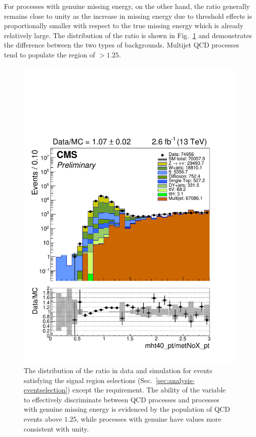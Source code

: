For processes with genuine missing energy, on the other hand, the ratio 
generally remains close to unity as the increase in missing energy due to 
threshold effects is proportionally smaller with respect to the true missing 
energy which is already relatively large. The distribution of the \mhtmet 
ratio is shown in Fig.~\ref{fig:mhtmet} and demonstrates the difference between 
the two types of backgrounds. Multijet QCD processes tend to populate the 
region of \mhtmet$>1.25$.

\begin{figure}[t!]
\begin{center}
\includegraphics[width=0.7\linewidth]{figs/analysis/mhtmet}
\caption{The distribution of the \mhtmet ratio in data and simulation for 
events satisfying the signal region selections 
(Sec.~\ref{sec:analysis-eventselection}) except the \mhtmet requirement. The 
ability of the variable to effectively discriminate between QCD processes and 
processes with genuine missing energy is evidenced by the population of QCD 
events above $1.25$, while processes with genuine \met have values more 
consistent with unity.}
\label{fig:mhtmet}
\end{center}
\end{figure}





